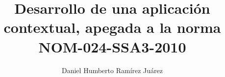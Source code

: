 
\title{Desarrollo de una aplicación contextual, apegada a la norma NOM-024-SSA3-2010}
\author{Daniel Humberto Ramírez Juárez}





%



%
%
%
%

\newtheorem{definicion}{Definición}
\newtheorem{teorema}{Teorema}
\newtheorem{corolario}{Corolario}
\newtheorem{lema}{Lema}
\newtheorem{proposicion}{Proposición}
\newtheorem{problema}{Problema}
\newtheorem{ejemplo}{Ejemplo}
\newtheorem{Cuadro}{Tabla}
\newtheorem{remark}{Observación}

\def\tablesp{\def\baselinestretch{1.1}\large\normalsize}
\def\subtema{\subsubsection*}